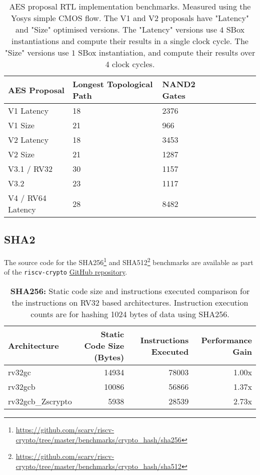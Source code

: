 \begin{table}[h]
\centering
\begin{tabular}{llllllll}
AES Proposal & Longest Topological Path & NAND2 Gates \\ \hline
V1 Latency   & 18                       & 2376        \\
V1 Size      & 21                       & 966         \\
V2 Latency   & 18                       & 3453        \\
V2 Size      & 21                       & 1287        \\
V3.1 / RV32  & 30                       & 1157        \\
V3.2         & 23                       & 1117        \\
V4 / RV64 Latency & 28                  & 8482        \\
\end{tabular}
\caption{
AES proposal RTL implementation benchmarks.
Measured using the Yosys simple CMOS flow.
The V1 and V2 proposals have "Latency" and "Size" optimised versions.
The "Latency" versions use $4$ SBox instantiations and compute their
results in a single clock cycle.
The "Size" versions use $1$ SBox instantiation, and compute their
results over 4 clock cycles.
}
\label{tab:benchmarks:aes:impl}
\end{table}

\newpage
\subsection{SHA2}
\label{sec:benchmark:sha2}

The source code for the
SHA256\footnote{\url{https://github.com/scarv/riscv-crypto/tree/master/benchmarks/crypto_hash/sha256}}
and
SHA512\footnote{\url{https://github.com/scarv/riscv-crypto/tree/master/benchmarks/crypto_hash/sha512}}
benchmarks are available as part of the {\tt riscv-crypto}
\href{https://github.com/scarv/riscv-crypto/tree/master/benchmarks/crypto_block/aes}{GitHub repository}.

\begin{table}[h]
\centering
\begin{tabular}{lrrr}
Architecture      & Static Code Size (Bytes) & Instructions Executed & Performance Gain \\ \hline
rv32gc            & 14934                    & 78003 & 1.00x          \\
rv32gcb           & 10086                    & 56866 & 1.37x          \\
rv32gcb\_Zscrypto & 5938                     & 28539 & 2.73x 
\end{tabular}
\caption{{\bf SHA256:}
Static code size and instructions executed comparison for
the  instructions on RV32 based architectures.
Instruction execution counts are for hashing 1024 bytes of data using
SHA256.
}
\label{tab:benchmarks:sha256}
\end{table}


